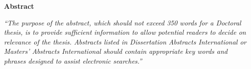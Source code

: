 \begin{center}
\textbf{\large Abstract}
\end{center}


\vspace{1cm}

\emph{``The purpose of the abstract, which should not exceed 350 words for a Doctoral thesis, is to provide
sufficient information to allow potential readers to decide on relevance
of the thesis. Abstracts listed in Dissertation Abstracts International
or Masters' Abstracts International should contain appropriate key
words and phrases designed to assist electronic searches.''}

